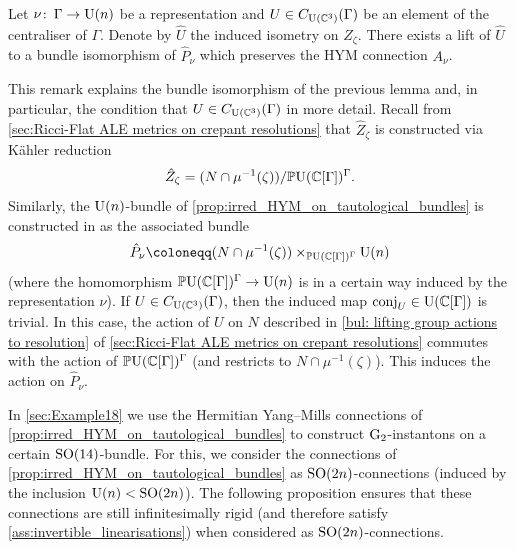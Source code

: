 \documentclass[11pt,a4paper]{scrartcl}
\newcommand{\col}{\colon \thinspace}
\newcommand{\G}{\textup{G}}
\newcommand{\SO}{\textup{SO}}
\newcommand{\U}{\textup{U}}
\numberwithin{equation}{section}
\theoremstyle{plain}
\theoremstyle{definition}
\theoremstyle{remark}
\begin{document}
\begin{lemma}\label{lem:group_lift_to_HYMbundle}
Let $\nu \col \Gamma \to \U(n)$ be a representation and $U\in C_{\U(\mathbb{C}^3)}(\Gamma)$ be an element of the centraliser of $\Gamma$. Denote by $\hat{U}$ the induced isometry on $\hat{Z}_\zeta$. There exists a lift of $\hat{U}$ to a bundle isomorphism of $\hat{P}_\nu$ which preserves the HYM connection $A_\nu$.
\end{lemma}
\begin{remark}
This remark explains the bundle isomorphism of the previous lemma and, in particular, the condition that $U \in C_{\U(\mathbb{C}^3)}(\Gamma)$ in more detail. Recall from \autoref{sec:Ricci-Flat ALE metrics on crepant resolutions} that $\hat{Z}_\zeta$ is constructed via Kähler reduction \[ \hat{Z}_\zeta = (N\cap \mu^{-1}(\zeta))/\mathbb{P}\U(\mathbb{C}[\Gamma])^\Gamma.\] Similarly, the $\U(n)$-bundle of \autoref{prop:irred_HYM_on_tautological_bundles} is constructed in \cite[Equation~(3.4)]{WalpuskiDegeratu-HYM_on_crepant_resolutions} as the associated bundle \[ \hat{P}_\nu \coloneqq (N\cap \mu^{-1}(\zeta))\times_{\mathbb{P}\U(\mathbb{C}[\Gamma])^\Gamma} \U(n) \] (where the homomorphism $\mathbb{P}\U(\mathbb{C}[\Gamma])^\Gamma \to \U(n)$ is in a certain way induced by the representation $\nu$). If $U\in C_{\U(\mathbb{C}^3)}(\Gamma)$, then the induced map $\textup{conj}_U\in \U(\mathbb{C}[\Gamma])$ is trivial. In this case, the action of $U$ on $N$ described in \autoref{bul: lifting group actions to resolution} of \autoref{sec:Ricci-Flat ALE metrics on crepant resolutions} commutes with the action of $\mathbb{P}\U(\mathbb{C}[\Gamma])^\Gamma$ (and restricts to $N\cap \mu^{-1}(\zeta)$). This induces the action on $\hat{P}_\nu$.
\end{remark}

In \autoref{sec:Example18} we use the Hermitian Yang--Mills connections of \autoref{prop:irred_HYM_on_tautological_bundles} to construct $\G_2$-instantons on a certain $\SO(14)$-bundle. For this, we consider the connections of \autoref{prop:irred_HYM_on_tautological_bundles} as $\SO(2n)$-connections (induced by the inclusion $\U(n) < \SO(2n)$). The following proposition ensures that these connections are still infinitesimally rigid (and therefore satisfy \autoref{ass:invertible_linearisations}) when considered as $\SO(2n)$-connections. 
\end{document}
